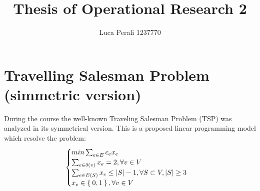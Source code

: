 \documentclass[12pt]{article}
\begin{document}
\title{Thesis of Operational Research 2}
\author{Luca Perali 1237770}



\section{Travelling Salesman Problem (simmetric version)}
During the course the well-known Traveling Salesman Problem (TSP) was analyzed in its symmetrical version.
This is a proposed linear programming model which resolve the problem:
\[
\begin{cases}
min \sum_{ e\in E } c_ex_e \\
\sum_{e\in \delta (v) } x_e = 2, \forall v \in V \\
\sum_{e\in E(S) } x_e \le |S|-1, \forall S \subset V, |S| \ge 3 \\
x_e \in \Set{0,1}, \forall v \in V
\end{cases}
\]



\end{document}
